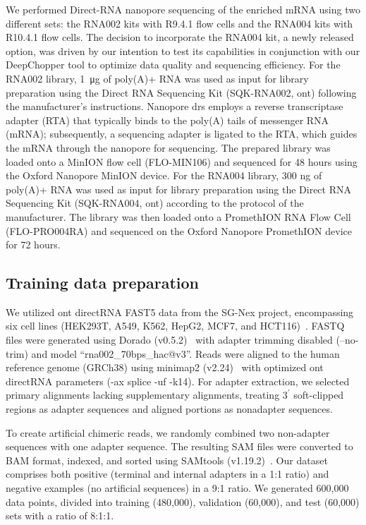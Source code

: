\documentclass[pdflatex, sn-mathphys-num, lineno]{sn-jnl}%
\theoremstyle{thmstyleone}%
\theoremstyle{thmstyletwo}%
\theoremstyle{thmstylethree}%
\begin{document}
We performed Direct-RNA nanopore sequencing of the enriched mRNA using two different sets: the RNA002 kits with R9.4.1 flow cells and the RNA004 kits with R10.4.1 flow cells.
The decision to incorporate the RNA004 kit, a newly released option, was driven by our intention to test its capabilities in conjunction with our DeepChopper tool to optimize data quality and sequencing efficiency.
For the RNA002 library, \SI{1}{\micro\gram} of poly(A)+ RNA was used as input for library preparation using the Direct RNA Sequencing Kit (SQK-RNA002, \gls{ont}) following the manufacturer's instructions.
Nanopore \gls{drs} employs a reverse transcriptase adapter (RTA) that typically binds to the poly(A) tails of messenger RNA (mRNA); subsequently, a sequencing adapter is ligated to the RTA, which guides the mRNA through the nanopore for sequencing.
The prepared library was loaded onto a MinION flow cell (FLO-MIN106) and sequenced for 48 hours using the Oxford Nanopore MinION device.
For the RNA004 library, 300 ng of poly(A)+ RNA was used as input for library preparation using the Direct RNA Sequencing Kit (SQK-RNA004, \gls{ont}) according to the protocol of the manufacturer.
The library was then loaded onto a PromethION RNA Flow Cell (FLO-PRO004RA) and sequenced on the Oxford Nanopore PromethION device for 72 hours.

\subsection{Training data preparation}\label{ssec:data}

We utilized \gls{ont} directRNA FAST5 data from the SG-Nex project, encompassing six cell lines (HEK293T, A549, K562, HepG2, MCF7, and HCT116)~\cite{chen2021systematic}.
FASTQ files were generated using Dorado (v0.5.2)~\cite{dorado2023} with adapter trimming disabled (--no-trim) and  model ``rna002\_70bps\_hac@v3''.
Reads were aligned to the human reference genome (GRCh38) using minimap2 (v2.24)~\cite{li2018minimap2} with optimized \gls{ont} directRNA parameters (-ax splice -uf -k14).
For adapter extraction, we selected primary alignments lacking supplementary alignments, treating \(3^{\prime}\)  soft-clipped regions as adapter sequences and aligned portions as nonadapter sequences.

To create artificial chimeric reads, we randomly combined two non-adapter sequences with one adapter sequence.
The resulting SAM files were converted to BAM format, indexed, and sorted using SAMtools (v1.19.2)~\cite{li2009sequence}.
Our dataset comprises both positive (terminal and internal adapters in a 1:1 ratio) and negative examples (no artificial sequences) in a 9:1 ratio.
We generated 600,000 data points, divided into training (480,000), validation (60,000), and test (60,000) sets with a ratio of 8:1:1.
\end{document}
